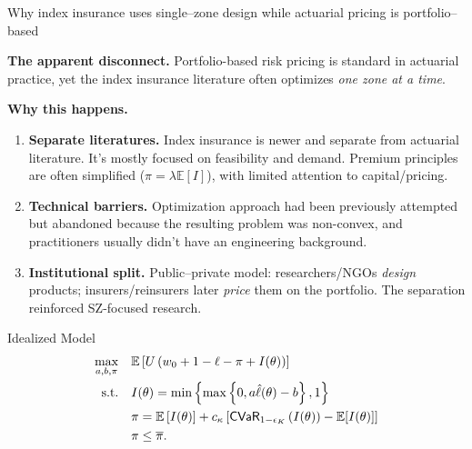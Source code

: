 \documentclass{beamer}
\begin{document}
\begin{frame}{Why index insurance uses single–zone design while actuarial pricing is portfolio–based}
  \small
  
  \textbf{The apparent disconnect.} 
  Portfolio-based risk pricing is standard in actuarial practice, yet the index insurance literature often optimizes \emph{one zone at a time}.
  
  \medskip
  \textbf{Why this happens.}
  \begin{enumerate}\itemsep2pt
    \item \textbf{Separate literatures.} Index insurance is newer and separate from actuarial literature. It's mostly focused on feasibility and demand.
          Premium principles are often simplified ($\pi = \lambda \mathbb{E}[I]$), with limited attention to capital/pricing.
    \item \textbf{Technical barriers.} Optimization approach had been previously attempted but abandoned because the resulting problem was non-convex, and practitioners usually didn't have an engineering background.
    \item \textbf{Institutional split.} Public–private model: researchers/NGOs \emph{design} products; insurers/reinsurers later \emph{price} them on the portfolio. The separation reinforced SZ-focused research.
  \end{enumerate}
  
  \end{frame}

\begin{frame}{Idealized Model}
\begin{align}
    \max_{a,b,\pi}  & \quad \mathbb{E} \left [ U\left ( w_0 + 1 - \ell - \pi + I(\theta) \right ) \right ] \label{cons-objective}\\
    \text{s.t.} & \quad I(\theta) =  \min \left \{\max \left \{0,a\hat{\ell}(\theta) - b \right \}, 1 \right \}\label{cons-contract}\\
    & \quad \pi = \mathbb{E}\left [ I(\theta) \right ] + c_{\kappa} \left[ {\sf CVaR}_{1-\epsilon_K}\left ( I(\theta)\right )  - \mathbb{E}[I(\theta)]  \right] \\
    &\quad \pi \leq \overline{\pi}.
\end{align}
\end{frame}
\end{document}
